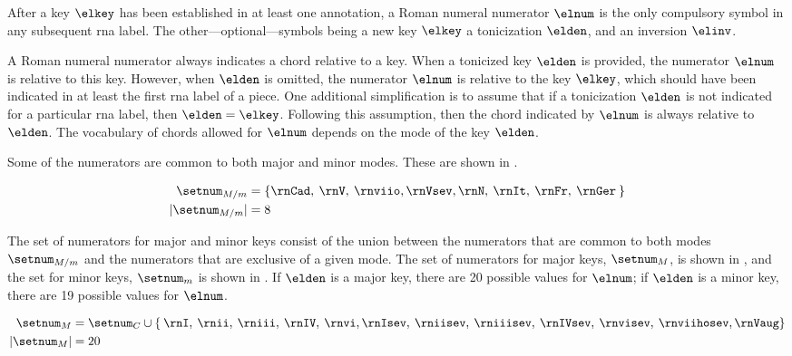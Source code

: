 
After a key $\elkey$ has been established in at least one
annotation, a Roman numeral numerator $\elnum$ is the only
compulsory symbol in any subsequent \gls{rna} label. The
other---optional---symbols being a new key $\elkey$ a
tonicization $\elden$, and an inversion $\elinv$.

A Roman numeral numerator always indicates a chord relative
to a key. When a tonicized key $\elden$ is provided, the
numerator $\elnum$ is relative to this key. However, when
$\elden$ is omitted, the numerator $\elnum$ is relative to
the key $\elkey$, which should have been indicated in at
least the first \gls{rna} label of a piece. One additional
simplification is to assume that if a tonicization $\elden$
is not indicated for a particular \gls{rna} label, then
$\elden = \elkey$. Following this assumption, then the chord
indicated by $\elnum$ is always relative to $\elden$. The
vocabulary of chords allowed for $\elnum$ depends on the
mode of the key $\elden$.

Some of the numerators are common to both major and minor
modes. These are shown in . 

\begin{equation}
    \label{eq:common_numerators}
    \begin{split}
    \setnum_{M/m} &= \{ \rnCad, \: \rnV, \: \rnviio,
    \rnVsev, \rnN, \: \rnIt, \: \rnFr, \: \rnGer \: \} \\
    | \setnum_{M/m} | &= 8
    \end{split}
\end{equation}

The set of numerators for major and minor keys consist of
the union between the numerators that are common to both
modes $\setnum_{M/m}$ and the numerators that are exclusive
of a given mode. The set of numerators for major keys,
$\setnum_{M}$, is shown in , and the
set for minor keys, $\setnum_{m}$ is shown in
. If $\elden$ is a major key, there
are 20 possible values for $\elnum$; if $\elden$ is a minor
key, there are 19 possible values for $\elnum$.

\begin{equation}
    \label{eq:major_numerators}
    \begin{split}
    \setnum_{M} &= \setnum_{C} \cup \{ \: \rnI, \: \rnii, \: 
    \rniii, \: \rnIV, \: \rnvi, \rnIsev, \: \rniisev, \: 
    \rniiisev, \: \rnIVsev, \: \rnvisev, \: \rnviihosev, \rnVaug \} \\
    | \setnum_{M} | &= 20
    \end{split}
\end{equation}

